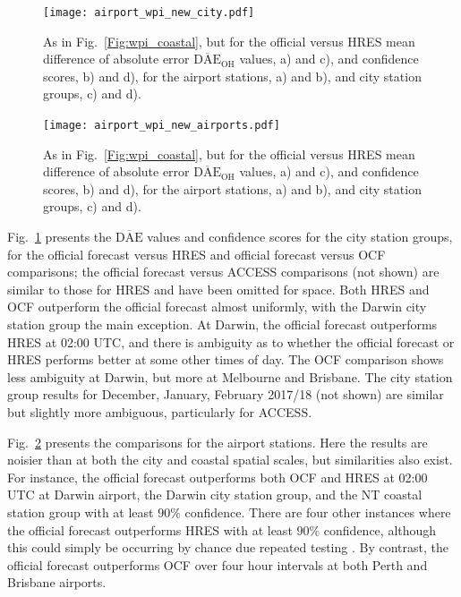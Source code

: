 \documentclass[twocol]{ametsoc}
\begin{document}
\begin{figure}
\centering
\texttt{[image: airport\_wpi\_new\_city.pdf]}
\caption{As in Fig.~\ref{Fig:wpi_coastal}, but for the official versus HRES mean difference of absolute error $\overline{\text{DAE}}_\text{OH}$ values, a) and c), and confidence scores, b) and d), for the airport stations, a) and b), and city station groups, c) and d).}
\label{Fig:city_wpi}
\end{figure}

\begin{figure}
\centering
\texttt{[image: airport\_wpi\_new\_airports.pdf]}
\caption{As in Fig.~\ref{Fig:wpi_coastal}, but for the official versus HRES mean difference of absolute error $\overline{\text{DAE}}_\text{OH}$ values, a) and c), and confidence scores, b) and d), for the airport stations, a) and b), and city station groups, c) and d).}
\label{Fig:airport_wpi}
\end{figure}

Fig.~\ref{Fig:city_wpi} presents the $\overline{\text{DAE}}$ values and confidence scores for the city station groups, for the official forecast versus HRES and official forecast versus OCF comparisons; the official forecast versus ACCESS comparisons (not shown) are similar to those for HRES and have been omitted for space. Both HRES and OCF outperform the official forecast almost uniformly, with the Darwin city station group the main exception. At Darwin, the official forecast outperforms HRES at 02:00 UTC, and there is ambiguity as to whether the official forecast or HRES performs better at some other times of day. The OCF comparison shows less ambiguity at Darwin, but more at Melbourne and Brisbane. The city station group results for December, January, February 2017/18 (not shown) are similar but slightly more ambiguous, particularly for ACCESS.  

Fig.~\ref{Fig:airport_wpi} presents the comparisons for the airport stations. Here the results are noisier than at both the city and coastal spatial scales, but similarities also exist. For instance, the official forecast outperforms both OCF and HRES at 02:00 UTC at Darwin airport, the Darwin city station group, and the NT coastal station group with at least $90\%$ confidence. There are four other instances where the official forecast outperforms HRES with at least $90\%$ confidence, although this could simply be occurring by chance due repeated testing \citep[p. 178]{wilks11}. By contrast, the official forecast outperforms OCF over four hour intervals at both Perth and Brisbane airports.
\end{document}
